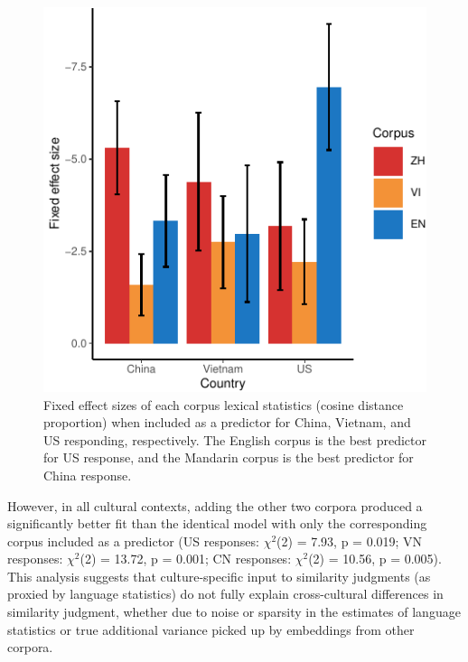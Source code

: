 \documentclass[10pt, letterpaper]{article}
\newenvironment{CodeChunk}{}{}
\begin{document}
\begin{CodeChunk}
\begin{figure}[tb]

{\centering \includegraphics{figs/coeffs_cos-1} 

}

\caption[Fixed effect sizes of each corpus lexical statistics (cosine distance proportion) when included as a predictor for China, Vietnam, and US responding, respectively]{Fixed effect sizes of each corpus lexical statistics (cosine distance proportion) when included as a predictor for China, Vietnam, and US responding, respectively. The English corpus is the best predictor for US response, and the Mandarin corpus is the best predictor for China response.}\label{fig:coeffs_cos}
\end{figure}
\end{CodeChunk}

However, in all cultural contexts, adding the other two corpora produced
a significantly better fit than the identical model with only the
corresponding corpus included as a predictor (US responses:
\(\chi^2\)(2) = 7.93, p = 0.019; VN responses: \(\chi^2\)(2) = 13.72, p
= 0.001; CN responses: \(\chi^2\)(2) = 10.56, p = 0.005). This analysis
suggests that culture-specific input to similarity judgments (as proxied
by language statistics) do not fully explain cross-cultural differences
in similarity judgment, whether due to noise or sparsity in the
estimates of language statistics or true additional variance picked up
by embeddings from other corpora.
\end{document}
